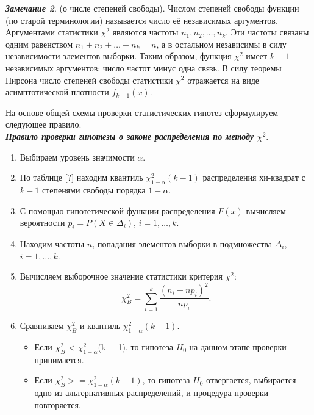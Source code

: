 \textbf{\textit{Замечание 2}}. (о числе степеней свободы).
Числом степеней свободы функции (по старой терминологии) называется число её независимых аргументов. Аргументами статистики $\chi^{2}$ являются частоты $n_{1},n_{2}, \dots,n_{k}$. Эти частоты связаны одним равенством $n_{1} + n_{2} + \dots + n_{k}  = n$, а в остальном независимы в силу независимости элементов выборки. Таким образом, функция $\chi^{2}$  имеет $k-1$ независимых аргументов: число частот минус одна связь. В силу теоремы Пирсона число степеней свободы статистики $\chi^{2}$  отражается на виде асимптотической плотности $f_{k - 1}(x)$.

На основе общей схемы проверки статистических гипотез сформулируем следующее правило. \\

\textbf{\textit{Правило проверки гипотезы о законе распределения по методу $\chi^{2}$}}.

\begin{enumerate}
	\item Выбираем уровень значимости $\alpha$.
	
	\item По таблице [?] находим квантиль $\chi^{2}_{1-\alpha}(k - 1)$ распределения хи-квадрат с $k-1$ степенями свободы порядка $1-\alpha$. 
	
	\item С помощью гипотетической функции распределения $F(x)$ вычисляем вероятности $p_{i} = P (X \in \Delta_{i})$, $i = 1, \dots, k$.
	
	\item Находим частоты $n_{i}$ попадания элементов выборки в подмножества $\Delta_{i}$, $i = 1, \dots, k$.
	
	\item Вычисляем выборочное значение статистики критерия $\chi^{2}$:
	\begin{equation}
		\chi^{2}_{B} =\sum_{i = 1}^{k}{\frac{(n_{i} - np_{i})^{2}}{np_{i}}}.
		\label{eq:chi_B}
	\end{equation}

	\item Сравниваем $\chi^{2}_{B}$ и квантиль $\chi^{2}_{1-\alpha}(k-1)$.
	\begin{itemize}
		\item Если $\chi^{2}_{B}$ < $\chi^{2}_{1-\alpha}$(k $-$ 1), то гипотеза $H_{0}$ на данном этапе проверки принимается.
		
		\item Если $\chi^{2}_{B} >= \chi^{2}_{1-\alpha}(k -1)$, то гипотеза $H_{0}$ отвергается, выбирается одно из альтернативных распределений, и процедура проверки повторяется.
	\end{itemize}
\end{enumerate} 


